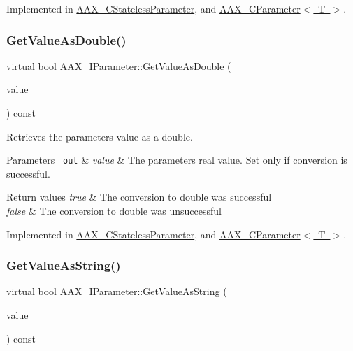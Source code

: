 Implemented in \mbox{\hyperlink{a01541_a8d925887f2c4ea3b6d06e077c06fc01f}{A\+A\+X\+\_\+\+C\+Stateless\+Parameter}}, and \mbox{\hyperlink{a01537_a468c96e334e4155490fca7369f7ad323}{A\+A\+X\+\_\+\+C\+Parameter$<$ T $>$}}.

\mbox{\label{a01857_ad9ab3c9e0ee521e445f44b77ae5d9d06}} 
\subsubsection{\texorpdfstring{GetValueAsDouble()}{GetValueAsDouble()}}
{\footnotesize\ttfamily virtual bool A\+A\+X\+\_\+\+I\+Parameter\+::\+Get\+Value\+As\+Double (\begin{DoxyParamCaption}\item[{double $\ast$}]{value }\end{DoxyParamCaption}) const\hspace{0.3cm}{\ttfamily [pure virtual]}}



Retrieves the parameter\textquotesingle{}s value as a double. 


\begin{DoxyParams}[1]{Parameters}
\mbox{\texttt{ out}}  & {\em value} & The parameter\textquotesingle{}s real value. Set only if conversion is successful.\\
\hline
\end{DoxyParams}

\begin{DoxyRetVals}{Return values}
{\em true} & The conversion to double was successful \\
\hline
{\em false} & The conversion to double was unsuccessful \\
\hline
\end{DoxyRetVals}


Implemented in \mbox{\hyperlink{a01541_afecb7c86751c21230ba6e049aa70a19a}{A\+A\+X\+\_\+\+C\+Stateless\+Parameter}}, and \mbox{\hyperlink{a01537_ae9687028a6c6a5e93223fde4ca9c06ea}{A\+A\+X\+\_\+\+C\+Parameter$<$ T $>$}}.

\mbox{\label{a01857_ab0d640c37120decbbe48f0c1483770f9}} 
\subsubsection{\texorpdfstring{GetValueAsString()}{GetValueAsString()}}
{\footnotesize\ttfamily virtual bool A\+A\+X\+\_\+\+I\+Parameter\+::\+Get\+Value\+As\+String (\begin{DoxyParamCaption}\item[{\mbox{\hyperlink{a01873}{A\+A\+X\+\_\+\+I\+String}} $\ast$}]{value }\end{DoxyParamCaption}) const\hspace{0.3cm}{\ttfamily [pure virtual]}}



